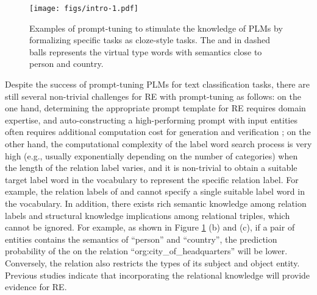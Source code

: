 \documentclass[sigconf]{acmart}
\begin{document}
\begin{figure}[t!]
    \centering
    \texttt{[image: figs/intro-1.pdf]}
    \caption{Examples of prompt-tuning to stimulate the knowledge of PLMs by formalizing specific tasks as cloze-style tasks. The  and   in  dashed balls represents the virtual type words with semantics close to person and country.}
    \label{fig:example}
\end{figure}


Despite the success of prompt-tuning PLMs for text classification tasks, there are still several non-trivial challenges for RE with prompt-tuning as follows:
on the one hand, determining the appropriate prompt template for RE requires domain expertise, and auto-constructing a high-performing prompt with input entities often requires additional computation cost for generation and verification \cite{schick2020automatically,DBLP:conf/eacl/SchickS21,shin2020eliciting,DBLP:journals/corr/abs-2012-15723};
on the other hand, the computational complexity of the label word search process is very high (e.g., usually exponentially depending on the number of categories) when the length of the relation label varies, and it is non-trivial to obtain a suitable target label word in the vocabulary to represent the specific relation label.
For example, the relation labels of  and  cannot specify a single suitable label word in the vocabulary.
In addition, there exists rich semantic knowledge among relation labels and structural knowledge implications among relational triples, which cannot be ignored.
For example, as shown in Figure \ref{fig:example} (b) and (c), if a pair of entities contains the semantics of ``person'' and ``country'', the prediction probability of the  on the relation ``org:city\_of\_headquarters'' will be lower.
Conversely, the relation also restricts the types of its
subject and object entity.
Previous studies \cite{li2019improving,distiawan2019neural,bastos2021recon} indicate that incorporating the relational knowledge will provide evidence for RE.
\end{document}
